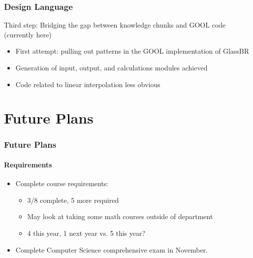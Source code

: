 \documentclass{beamer}
\begin{document}

\begin{frame}

\frametitle{Design Language}

Third step:  Bridging the gap between knowledge chunks and GOOL code (currently here)\\[12pt]

\begin{itemize}
\item First attempt:  pulling out patterns in the GOOL implementation of GlassBR 
\item Generation of input, output, and calculations modules achieved
\item Code related to linear interpolation less obvious
\end{itemize}

\end{frame}



\section[Future Plans]{Future Plans}


\begin{frame}

\frametitle{Future Plans}
\framesubtitle{Requirements}


\begin{itemize}
\item Complete course requirements:
  \begin{itemize}
  \item 3/8 complete, 5 more required
  \item May look at taking some math courses outside of department
  \item 4 this year, 1 next year vs. 5 this year?
  \end{itemize}
\item Complete Computer Science comprehensive exam in November.
\end{itemize}
\end{frame}

\end{document}
